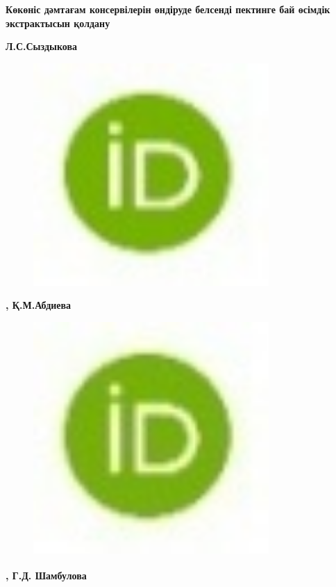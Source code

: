 
{\bfseries Көкөніс дәмтағам консервілерін өндіруде белсенді пектинге бай
өсімдік экстрактысын қолдану}

{\bfseries Л.С.Сыздыкова}
\begin{figure}[H]
	\centering
	\includegraphics[width=0.8\textwidth]{media/pish2/image75}
	\caption*{}
\end{figure}
{\bfseries ,
Қ.М.Абдиева}
\begin{figure}[H]
	\centering
	\includegraphics[width=0.8\textwidth]{media/pish2/image76}
	\caption*{}
\end{figure}
{\bfseries \textsuperscript{\envelope },
Г.Д.
Шамбулова}
